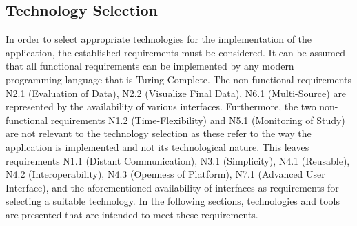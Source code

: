 


\subsection{Technology Selection}

In order to select appropriate technologies for the implementation of the application, the established requirements must be considered. It can be assumed that all functional requirements can be implemented by any modern programming language that is Turing-Complete. The non-functional requirements N2.1 (Evaluation of Data), N2.2 (Visualize Final Data), N6.1 (Multi-Source) are represented by the availability of various interfaces. Furthermore, the two non-functional requirements N1.2 (Time-Flexibility) and N5.1 (Monitoring of Study) are not relevant to the technology selection as these refer to the way the application is implemented and not its technological nature. This leaves requirements N1.1 (Distant Communication), N3.1 (Simplicity), N4.1 (Reusable), N4.2 (Interoperability), N4.3 (Openness of Platform), N7.1 (Advanced User Interface), and the aforementioned availability of interfaces as requirements for selecting a suitable technology. In the following sections, technologies and tools are presented that are intended to meet these requirements.


